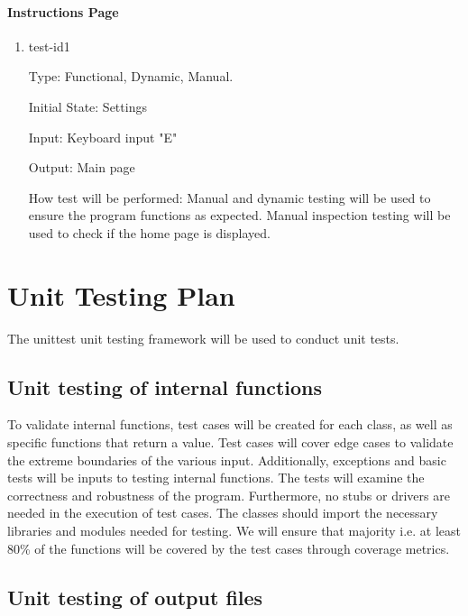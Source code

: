\documentclass[12pt, titlepage]{article}
\begin{document}
\paragraph{Instructions Page}

\begin{enumerate}
	
	\item{test-id1\\}
	
	Type: Functional, Dynamic, Manual.
	
	Initial State: Settings 
	
	Input: Keyboard input "E"
	
	Output: Main page
	
	How test will be performed: Manual and dynamic testing will be used to ensure the program functions as expected. Manual inspection testing will be used to check if the home page is displayed. 
	
\end{enumerate}

				
\section{Unit Testing Plan}


The unittest unit testing framework will be used to conduct unit tests.
		
\subsection{Unit testing of internal functions}

	
To validate internal functions, test cases will be created for each class, as well as specific functions that return a value. Test cases will cover edge cases to validate the extreme boundaries of the various input. Additionally, exceptions and basic tests will be inputs to testing internal functions. The tests will examine the correctness and robustness of the program.  Furthermore, no stubs or drivers are needed in the execution of test cases. The classes should import the necessary libraries and modules needed for testing. We will ensure that majority {i.e. at least 80\%} of the functions will be covered by the test cases through coverage metrics. 


\subsection{Unit testing of output files}		
\end{document}
